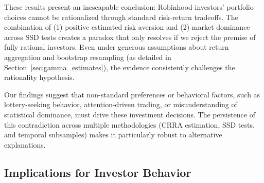 These results present an inescapable conclusion: Robinhood investors' portfolio choices cannot be rationalized through standard risk-return tradeoffs. 
The combination of (1) positive estimated risk aversion and (2) market dominance across SSD tests creates a paradox that only resolves if we reject the premise of fully rational investors.
Even under generous assumptions about return aggregation and bootstrap resampling (as detailed in Section~\ref{sec:gamma_estimates}), the evidence consistently challenges the rationality hypothesis.

Our findings suggest that non-standard preferences or behavioral factors, such as lottery-seeking behavior, attention-driven trading, or misunderstanding of statistical dominance, must drive these investment decisions. 
The persistence of this contradiction across multiple methodologies (CRRA estimation, SSD tests, and temporal subsamples) makes it particularly robust to alternative explanations.


\subsection{Implications for Investor Behavior}
